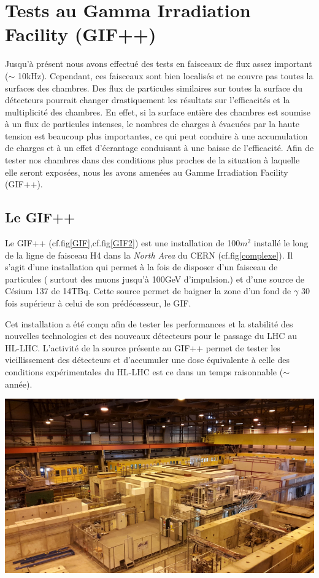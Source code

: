 \section {Tests au Gamma Irradiation Facility (GIF++)}
Jusqu'à présent nous avons effectué des tests en faisceaux de flux assez important ($\sim$ 10kHz). Cependant, ces faisceaux sont bien localisés et ne couvre pas toutes la surfaces des chambres. Des flux de particules similaires sur toutes la surface du détecteurs pourrait changer drastiquement les résultats sur l'efficacités et la multiplicité des chambres. En effet, si la surface entière des chambres est soumise à un flux de particules intenses, le nombres de charges à évacuées par la haute tension est beaucoup plus importantes, ce qui peut conduire à une accumulation de charges et à un effet d'écrantage conduisant à une baisse de l'efficacité. Afin de tester nos chambres dans des conditions plus proches de la situation à laquelle elle seront exposées, nous les avons amenées au Gamme Irradiation Facility (GIF++).

\subsection{Le GIF++}
Le GIF++ \cite{Jakel:1977147} (cf.fig\ref{GIF},cf.fig\ref{GIF2}) est une installation de 100$m^2$ installé le long de la ligne de faisceau H4 dans la \textit{North Area} du CERN (cf.fig\ref{complexe}). Il s'agit d'une installation qui permet à la fois de disposer d'un faisceau de particules ( surtout des muons jusqu'à 100GeV d'impulsion.) et d'une source de Césium 137 de 14TBq. Cette source permet de baigner la zone d'un fond de $\gamma$ 30 fois supérieur à celui de son prédécesseur, le GIF.

Cet installation a été conçu afin de tester les performances et la stabilité des nouvelles technologies et des nouveaux détecteurs pour le passage du LHC au HL-LHC. L'activité de la source présente au GIF++ permet de tester les vieillissement des détecteurs et d'accumuler une dose équivalente à celle des conditions expérimentales du HL-LHC est ce dans un temps raisonnable ($\sim$ année). 

\marginpar
{
	\centering
	\includegraphics[width=\marginparwidth]{GLA/GIF2.png}
	\label{GIF2}
}

